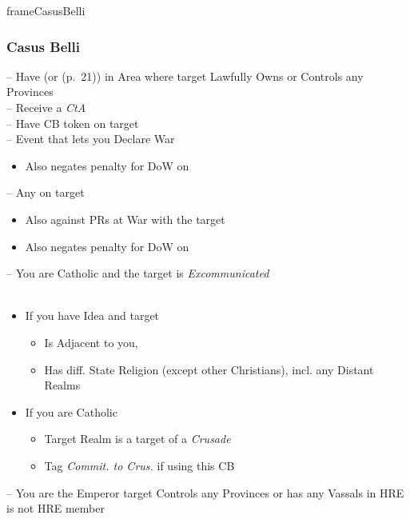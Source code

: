 \documentclass[10pt]{article}
\newlength{\fhCasusBelli} \setlength\fhCasusBelli{24\baselineskip}
\begin{document}
\begin{dynamiccontents*}{frameCasusBelli}\begin{eubox}{\fhCasusBelli}
	\subsubsection*{Casus Belli }
	 -- Have \claim (or \core (p.~21)) in Area where target Lawfully Owns or Controls any Provinces\\
	 -- Receive a \emph{CtA}\\
	 -- Have CB token on target\\
	 -- Event that lets you Declare War\\
	\begin{itemize}
		\item {}Also negates penalty for DoW on \marriage
	\end{itemize}
	 -- Any \disputedsuccession on target\\
	\begin{itemize}
		\item Also against PRs at War with the target
		\item {}Also negates penalty for DoW on \marriage
	\end{itemize}
	 -- You are Catholic and the target is \emph{Excommunicated}\\
	\\
	\begin{itemize}
		\item If you have  Idea and target
		\begin{itemize}
			\item Is Adjacent to you, 
			\item Has diff. State Religion (except other Christians), incl. any Distant Realms
		\end{itemize}
		\item If you are Catholic
		\begin{itemize}
			\item Target Realm is a target of a \emph{Crusade}
			\item Tag \emph{Commit. to Crus.} if using this CB
		\end{itemize}
	\end{itemize}
	 -- You are the Emperor  target Controls any Provinces or has any Vassals in HRE  is not HRE member
\end{eubox}\end{dynamiccontents*}
\end{document}

